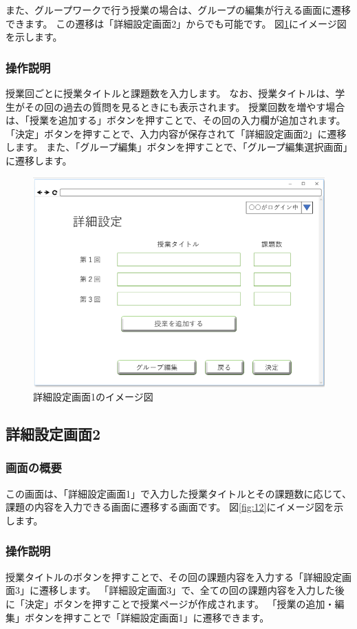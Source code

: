 また、グループワークで行う授業の場合は、グループの編集が行える画面に遷移できます。
この遷移は「詳細設定画面2」からでも可能です。
図\ref{fig:11}にイメージ図を示します。

\subsubsection{操作説明}
授業回ごとに授業タイトルと課題数を入力します。
なお、授業タイトルは、学生がその回の過去の質問を見るときにも表示されます。
授業回数を増やす場合は、「授業を追加する」ボタンを押すことで、その回の入力欄が追加されます。
「決定」ボタンを押すことで、入力内容が保存されて「詳細設定画面2」に遷移します。
また、「グループ編集」ボタンを押すことで、「グループ編集選択画面」に遷移します。

\begin{figure}[htbp]
  \begin{center}
    \includegraphics[width=0.8\linewidth,clip]{./img/11.png}
    \caption{詳細設定画面1のイメージ図}\label{fig:11}
  \end{center}
\end{figure}

\newpage

\subsection{詳細設定画面2}
\subsubsection{画面の概要}
この画面は、「詳細設定画面1」で入力した授業タイトルとその課題数に応じて、
課題の内容を入力できる画面に遷移する画面です。
図\ref{fig:12}にイメージ図を示します。

\subsubsection{操作説明}
授業タイトルのボタンを押すことで、その回の課題内容を入力する「詳細設定画面3」に遷移します。
「詳細設定画面3」で、全ての回の課題内容を入力した後に「決定」ボタンを押すことで授業ページが作成されます。
「授業の追加・編集」ボタンを押すことで「詳細設定画面1」に遷移できます。

